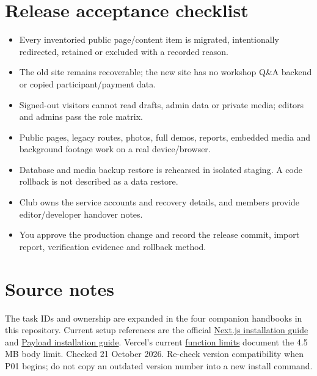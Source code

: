 \documentclass[11pt]{article}
\begin{document}
\section{Release acceptance checklist}
\begin{itemize}
\item[\texttt{[ ]}] Every inventoried public page/content item is migrated, intentionally redirected, retained or excluded with a recorded reason.
\item[\texttt{[ ]}] The old site remains recoverable; the new site has no workshop Q\&A backend or copied participant/payment data.
\item[\texttt{[ ]}] Signed-out visitors cannot read drafts, admin data or private media; editors and admins pass the role matrix.
\item[\texttt{[ ]}] Public pages, legacy routes, photos, full demos, reports, embedded media and background footage work on a real device/browser.
\item[\texttt{[ ]}] Database and media backup restore is rehearsed in isolated staging. A code rollback is not described as a data restore.
\item[\texttt{[ ]}] Club owns the service accounts and recovery details, and members provide editor/developer handover notes.
\item[\texttt{[ ]}] You approve the production change and record the release commit, import report, verification evidence and rollback method.
\end{itemize}

\section{Source notes}
The task IDs and ownership are expanded in the four companion handbooks in this repository. Current setup references are the official \href{https://nextjs.org/docs/app/getting-started/installation}{Next.js installation guide} and \href{https://payloadcms.com/docs/getting-started/installation}{Payload installation guide}. Vercel's current \href{https://vercel.com/docs/functions/limitations}{function limits} document the 4.5 MB body limit. Checked 21 October 2026. Re-check version compatibility when P01 begins; do not copy an outdated version number into a new install command.
\end{document}
